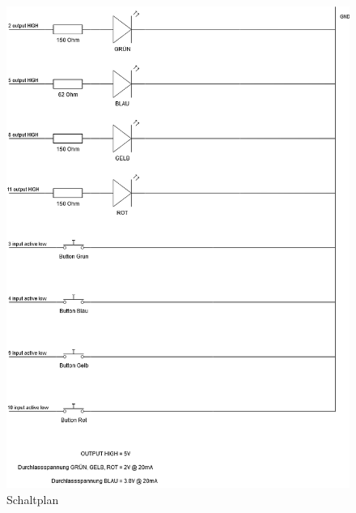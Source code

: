 \documentclass[a4paper]{article}
\begin{document}
\begin{figure}[H]
  \centering
  \includegraphics[width=1.0\linewidth]{media/senso-schaltplan.png}
  \caption{Schaltplan}
  \label{fig:schaltplan}
\end{figure}
\end{document}
